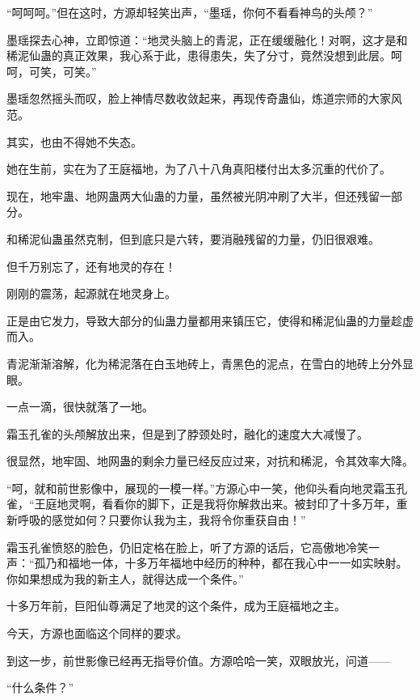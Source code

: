 \begin{this_body}
“呵呵呵。”但在这时，方源却轻笑出声，“墨瑶，你何不看看神鸟的头颅？”

墨瑶探去心神，立即惊道：“地灵头脑上的青泥，正在缓缓融化！对啊，这才是和稀泥仙蛊的真正效果，我心系于此，患得患失，失了分寸，竟然没想到此层。呵呵，可笑，可笑。”

墨瑶忽然摇头而叹，脸上神情尽数收敛起来，再现传奇蛊仙，炼道宗师的大家风范。

其实，也由不得她不失态。

她在生前，实在为了王庭福地，为了八十八角真阳楼付出太多沉重的代价了。

现在，地牢蛊、地网蛊两大仙蛊的力量，虽然被光阴冲刷了大半，但还残留一部分。

和稀泥仙蛊虽然克制，但到底只是六转，要消融残留的力量，仍旧很艰难。

但千万别忘了，还有地灵的存在！

刚刚的震荡，起源就在地灵身上。

正是由它发力，导致大部分的仙蛊力量都用来镇压它，使得和稀泥仙蛊的力量趁虚而入。

青泥渐渐溶解，化为稀泥落在白玉地砖上，青黑色的泥点，在雪白的地砖上分外显眼。

一点一滴，很快就落了一地。

霜玉孔雀的头颅解放出来，但是到了脖颈处时，融化的速度大大减慢了。

很显然，地牢固、地网蛊的剩余力量已经反应过来，对抗和稀泥，令其效率大降。

“呵，就和前世影像中，展现的一模一样。”方源心中一笑，他仰头看向地灵霜玉孔雀，“王庭地灵啊，看看你的脚下，正是我将你解救出来。被封印了十多万年，重新呼吸的感觉如何？只要你认我为主，我将令你重获自由！”

霜玉孔雀愤怒的脸色，仍旧定格在脸上，听了方源的话后，它高傲地冷笑一声：“孤乃和福地一体，十多万年福地中经历的种种，都在我心中一一如实映射。你如果想成为我的新主人，就得达成一个条件。”

十多万年前，巨阳仙尊满足了地灵的这个条件，成为王庭福地之主。

今天，方源也面临这个同样的要求。

到这一步，前世影像已经再无指导价值。方源哈哈一笑，双眼放光，问道——

“什么条件？”

\end{this_body}

